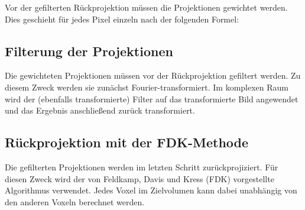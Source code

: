 Vor der gefilterten Rückprojektion müssen die Projektionen gewichtet werden. Dies geschieht für jedes Pixel einzeln nach der folgenden Formel:


\subsection{Filterung der Projektionen}

Die gewichteten Projektionen müssen vor der Rückprojektion gefiltert werden. Zu diesem Zweck werden sie zunächst Fourier-transformiert. Im komplexen
Raum wird der (ebenfalls transformierte) Filter auf das transformierte Bild angewendet und das Ergebnis anschließend zurück transformiert.


\subsection{Rückprojektion mit der FDK-Methode}

Die gefilterten Projektionen werden im letzten Schritt zurückprojiziert. Für diesen Zweck wird der von Feldkamp, Davis und Kress (FDK) vorgestellte
Algorithmus verwendet. Jedes Voxel im Zielvolumen kann dabei unabhängig von den anderen Voxeln berechnet werden.

